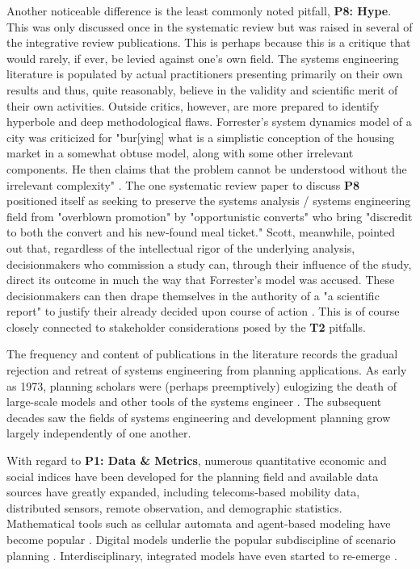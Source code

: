 Another noticeable difference is the least commonly noted pitfall, \textbf{P8: Hype}. This was only discussed once in the systematic review but was raised in several of the integrative review publications. This is perhaps because this is a critique that would rarely, if ever, be levied against one's own field. The systems engineering literature is populated by actual practitioners presenting primarily on their own results and thus, quite reasonably, believe in the validity and scientific merit of their own activities. Outside critics, however, are more prepared to identify hyperbole and deep methodological flaws. Forrester's system dynamics model of a city \cite{forresterUrbanDynamics1969} was criticized for "bur[ying] what is a simplistic conception of the housing market in a somewhat obtuse model, along with some other irrelevant components. He then claims that the problem cannot be understood without the irrelevant complexity" \cite{leejrRequiemLargeScaleModels1973}. The one systematic review paper to discuss \textbf{P8} positioned itself as seeking to preserve the systems analysis / systems engineering field from "overblown promotion" by "opportunistic converts" who bring "discredit to both the convert and his new-found meal ticket." \cite{brewerSystemsAnalysisUrban1973} Scott, meanwhile, pointed out that, regardless of the intellectual rigor of the underlying analysis, decisionmakers who commission a study can, through their influence of the study, direct its outcome in much the way that Forrester's model was accused. These decisionmakers can then drape themselves in the authority of a "a scientific report" to justify their already decided upon course of action \cite{scottSeeingStateHow2020}. This is of course closely connected to stakeholder considerations posed by the \textbf{T2} pitfalls.


The frequency and content of publications in the literature records the gradual rejection and retreat of systems engineering from planning applications. As early as 1973, planning scholars were (perhaps preemptively) eulogizing the death of large-scale models and other tools of the systems engineer \cite{leejrRequiemLargeScaleModels1973}. The subsequent decades saw the fields of systems engineering and development planning grow largely independently of one another.

With regard to \textbf{P1: Data \& Metrics}, numerous quantitative economic and social indices have been developed for the planning field \cite{boyceFrameworkDefiningApplying1972, cliftonQuantitativeAnalysisUrban2008,readAssetbasedEconomicDevelopment2012,sawickiNeighborhoodIndicatorsReview1996,valRegionalLocalEconomic1991} and available data sources have greatly expanded, including telecoms-based mobility data, distributed sensors, remote observation, and demographic statistics. Mathematical tools such as cellular automata and agent-based modeling have become popular \cite{battyCitiesComplexity2005,laufUncoveringLanduseDynamics2012}. Digital models underlie the popular subdiscipline of scenario planning \cite{goodspeedScenarioPlanningCities2020,zapataRadicalUncertaintyScenario2015}. Interdisciplinary, integrated models have even started to re-emerge \cite{millerIntegratedUrbanModeling2018,moeckelTrendsIntegratedLanduse2018,shahumyanIntegrationLandUse2017}. 

